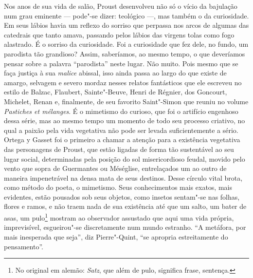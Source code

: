 Nos anos de sua vida de salão, Proust desenvolveu não só o vício da
bajulação num grau eminente --- pode"-se dizer: teológico ---, mas também o
da curiosidade. Em seus lábios havia um reflexo do sorriso que perpassa nos arcos de algumas das catedrais que tanto amava, passando pelos lábios das virgens tolas como fogo alastrado. É o sorriso da curiosidade.  Foi a curiosidade que fez dele, no fundo, um parodista tão grandioso? Assim, saberíamos, ao mesmo tempo, o que deveríamos pensar sobre a palavra ``parodista'' neste lugar. Não muito. Pois mesmo que se faça justiça à sua \emph{malice} abissal, isso ainda passa ao largo do que existe de amargo, selvagem e severo mordaz nesses relatos fantásticos que ele escreveu no estilo
de Balzac, Flaubert, Sainte"-Beuve, Henri de Régnier, dos Goncourt,
Michelet, Renan e, finalmente, de seu favorito Saint"-Simon que reuniu no
volume \emph{Pastiches et mélanges}. É o mimetismo do curioso, que foi o
artifício engenhoso dessa série, mas ao mesmo tempo um momento de todo
seu processo criativo, no qual a paixão pela vida vegetativa não pode
ser levada suficientemente a sério. Ortega y Gasset foi o primeiro a
chamar a atenção para a existência vegetativa das personagens de Proust,
que estão ligadas de forma tão sustentável ao seu lugar social,
determinadas pela posição do sol misericordioso feudal, movido pelo
vento que sopra de Guermantes ou Méséglise, entrelaçados um ao outro de
maneira impenetrável na densa mata de seus destinos. Desse círculo vital
brota, como método do poeta, o mimetismo. Seus conhecimentos mais exatos,
mais evidentes, estão pousados sob seus objetos, como insetos
sentam"-se nas folhas, flores e ramos, e não traem nada de sua
existência até que um salto, um bater de asas, um pulo\footnote{No
  original em alemão: \emph{Satz}, que além de pulo, significa frase, sentença. \versal{[N. T.]}}
mostram ao observador assustado que aqui uma vida própria, imprevisível,
esgueirou"-se discretamente num mundo estranho. ``A metáfora, por
mais inesperada que seja'', diz Pierre"-Quint, ``se apropria
estreitamente do pensamento''.

